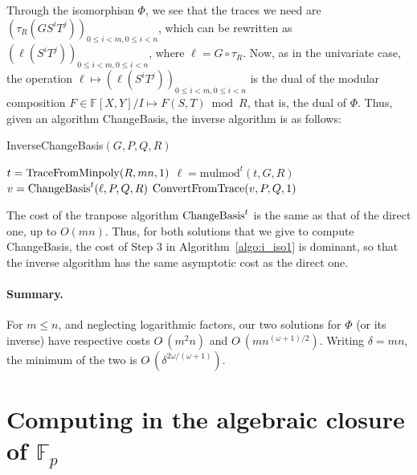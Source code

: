 \documentclass[12pt]{article}
\def\F {\ensuremath{\mathbb{F}}}
\def\mulmod {\ensuremath{\mathrm{mulmod}}}
\begin{document}
Through the isomorphism $\Phi$, we see that the traces we need are
$(\tau_R(G S^i T^j))_{0 \le i < m, 0 \le i < n}$, which can be
rewritten as $(\ell(S^i T^j))_{0 \le i < m, 0 \le i < n}$, where $\ell
= G \circ \tau_R$. Now, as in the univariate case, the operation $\ell
\mapsto (\ell(S^i T^j))_{0 \le i < m, 0 \le i < n}$ is the dual of the
modular composition $F \in \F[X,Y]/I \mapsto F(S,T) \bmod R$, that is,
the dual of $\Phi$. Thus, given an algorithm ChangeBasis, the inverse
algorithm is as follows:


\begin{algorithm}[H]
  \caption{InverseChangeBasis$(G,P,Q,R)$}
  \begin{algorithmic}[1]
   \STATE $t = {\rm TraceFromMinpoly}(R, mn, 1)$
   \STATE $\ell =\mulmod^t(t, G, R)$
   \STATE $v = {\rm ChangeBasis}^t(\ell, P, Q, R)$
   \RETURN ${\rm ConvertFromTrace}(v, P, Q, 1)$
  \end{algorithmic}
  \label{algo:i_iso1}
\end{algorithm}

The cost of the tranpose algorithm ${\rm ChangeBasis}^t$ is the same
as that of the direct one, up to $O(mn)$. Thus, for both solutions
that we give to compute ChangeBasis, the cost of Step 3 in
Algorithm~\ref{algo:i_iso1} is dominant, so that the inverse algorithm
has the same asymptotic cost as the direct one.

\paragraph{Summary.} For $m \le n$, and neglecting logarithmic factors,
our two solutions for $\Phi$ (or its inverse) have respective costs
$O\tilde{~}(m^2 n)$ and $O\tilde{~}(m n^{(\omega+1)/2})$. Writing
$\delta=mn$, the minimum of the two is
$O\tilde{~}(\delta^{2\omega/(\omega+1)})$.



\section{Computing in the algebraic closure of $\F_p$}
\end{document}
